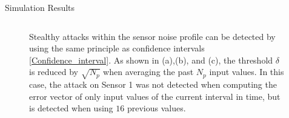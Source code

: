 \begin{section}{Simulation Results}
\begin{figure}
\begin{tabular}{cc}
\end{tabular}
\caption{Stealthy attacks within the sensor noise profile can be detected by using the same principle as confidence intervals \eqref{Confidence_interval}. As shown in (a),(b), and (c), the threshold $\delta$ is reduced by $\sqrt{N_p}$ when averaging the past $N_p$ input values. In this case, the attack on Sensor 1 was not detected when computing the error vector of only input values of the current interval in time, but is detected when using $16$ previous values. }

\end{figure}

\end{section}
